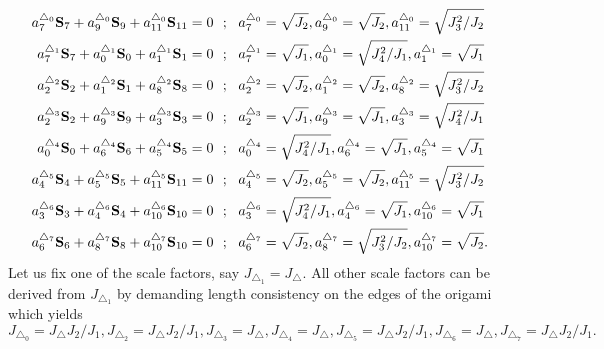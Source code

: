 \documentclass[a4paper,aps,prl,floatfix,showpacs,superscriptaddress,notitlepage]{revtex4-1}
\begin{document}
\begin{equation}
 \begin{split}
  a^{\triangle_0}_7{\bf S}_7 + a^{\triangle_0}_9{\bf S}_9 + a^{\triangle_0}_{11}{\bf S}_{11} &= 0~~;~~ a^{\triangle_0}_7=\sqrt{J_2}, a^{\triangle_0}_9=\sqrt{J_2}, a^{\triangle_0}_{11}=\sqrt{J_3^2/J_2} \\
  a^{\triangle_1}_7{\bf S}_7 + a^{\triangle_1}_0{\bf S}_0 + a^{\triangle_1}_{1}{\bf S}_{1} &= 0~~;~~ a^{\triangle_1}_7=\sqrt{J_1}, a^{\triangle_1}_0=\sqrt{J_4^2/J_1}, a^{\triangle_1}_{1}=\sqrt{J_1} \\
  a^{\triangle_2}_2{\bf S}_2 + a^{\triangle_2}_1{\bf S}_1 + a^{\triangle_2}_{8}{\bf S}_{8} &= 0~~;~~ a^{\triangle_2}_2=\sqrt{J_2}, a^{\triangle_2}_1=\sqrt{J_2}, a^{\triangle_2}_{8}=\sqrt{J_3^2/J_2} \\
  a^{\triangle_3}_2{\bf S}_2 + a^{\triangle_3}_9{\bf S}_9 + a^{\triangle_3}_{3}{\bf S}_{3} &= 0~~;~~ a^{\triangle_3}_2=\sqrt{J_1}, a^{\triangle_3}_9=\sqrt{J_1}, a^{\triangle_3}_{3}=\sqrt{J_4^2/J_1} \\
  a^{\triangle_4}_0{\bf S}_0 + a^{\triangle_4}_6{\bf S}_6 + a^{\triangle_4}_{5}{\bf S}_{5} &= 0~~;~~ a^{\triangle_4}_0=\sqrt{J_4^2/J_1}, a^{\triangle_4}_6=\sqrt{J_1}, a^{\triangle_4}_{5}=\sqrt{J_1} \\
  a^{\triangle_5}_4{\bf S}_4 + a^{\triangle_5}_5{\bf S}_5 + a^{\triangle_5}_{11}{\bf S}_{11} &= 0~~;~~ a^{\triangle_5}_4=\sqrt{J_2}, a^{\triangle_5}_5=\sqrt{J_2}, a^{\triangle_5}_{11}=\sqrt{J_3^2/J_2} \\
  a^{\triangle_6}_3{\bf S}_3 + a^{\triangle_6}_4{\bf S}_4 + a^{\triangle_6}_{10}{\bf S}_{10} &= 0~~;~~ a^{\triangle_6}_3=\sqrt{J_4^2/J_1}, a^{\triangle_6}_4=\sqrt{J_1}, a^{\triangle_6}_{10}=\sqrt{J_1} \\
  a^{\triangle_7}_6{\bf S}_6 + a^{\triangle_7}_8{\bf S}_8 + a^{\triangle_7}_{10}{\bf S}_{10} &= 0~~;~~ a^{\triangle_7}_6=\sqrt{J_2}, a^{\triangle_7}_8=\sqrt{J_3^2/J_2}, a^{\triangle_7}_{10}=\sqrt{J_2}. \\
 \end{split}
\end{equation}
Let us fix one of the scale factors, say $J_{\triangle_1}=J_{\triangle}$. All other scale factors can be derived from $J_{\triangle_1}$ by demanding length consistency on the edges of the origami which yields
\begin{equation}
 J_{\triangle_0}=J_{\triangle}J_2/J_1, J_{\triangle_2}=J_{\triangle}J_2/J_1, J_{\triangle_3}=J_{\triangle}, J_{\triangle_4}=J_{\triangle}, J_{\triangle_5}=J_{\triangle}J_2/J_1, J_{\triangle_6}=J_{\triangle}, J_{\triangle_7}=J_{\triangle}J_2/J_1. 
\end{equation}
\end{document}
